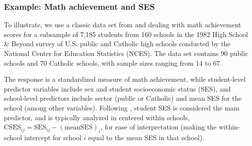 \subsubsection{Example: Math achievement and SES}

To illustrate, we use a classic data set from %
\citet{BrykRaudenbush:1992} and \citet{RaudenbushBryk:2002}
dealing with math achievement scores for a subsample of 7,185 students from 160 schools
in the 1982 High School \& Beyond survey of U.S. public and Catholic high
schools conducted by the National Center for Education Statistics (NCES).
The data set contains 90 public schools and 70 Catholic schools, with
sample sizes ranging from 14 to 67.

The response is a standardized measure of math achievement, while
student-level predictor variables include sex and student socioeconomic status (SES), and
school-level predictors include sector (public or Catholic) and mean SES for the
school (among other variables).
Following \citet{RaudenbushBryk:2002}, student SES is considered the main predictor, and is
typically analyzed in centered within schools,
$\mathrm{CSES}_{ij} = \mathrm{SES}_{ij} - \mathrm{(mean SES)}_i$, for ease of interpretation (making the within-school intercept for school $i$
equal to the mean SES in that school).




